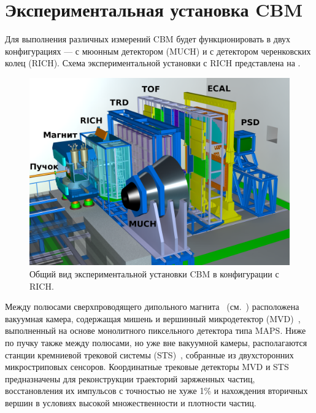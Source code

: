\section{Экспериментальная установка CBM}\label{sec:secCbmSetup}


Для выполнения различных измерений CBM будет функционировать в двух конфигурациях --- с мюонным детектором (MUCH) и с детектором черенковских колец (RICH). Схема экспериментальной установки с RICH представлена на .

\begin{figure}[H]
\includegraphics[width=1.0\textwidth]{pictures/1_CBM_SIS100_with_names.png}
\caption{Общий вид экспериментальной установки CBM в конфигурации с RICH.}
\label{fig:CBM}
\end{figure}

Между полюсами сверхпроводящего дипольного магнита~\cite{TDR_Magnet} (см.~) расположена вакуумная камера, содержащая мишень и вершинный микродетектор (MVD)~\cite{MVD_KOZIEL}, выполненный на основе монолитного пиксельного детектора типа MAPS. Ниже по пучку также между полюсами, но уже вне вакуумной камеры, располагаются станции кремниевой трековой системы (STS)~\cite{TDR_STS}, собранные из двухсторонних микростриповых сенсоров. Координатные трековые детекторы MVD и STS предназначены для реконструкции траекторий заряженных частиц, восстановления их импульсов с точностью не хуже 1\% и нахождения вторичных вершин в условиях высокой множественности и плотности частиц.

